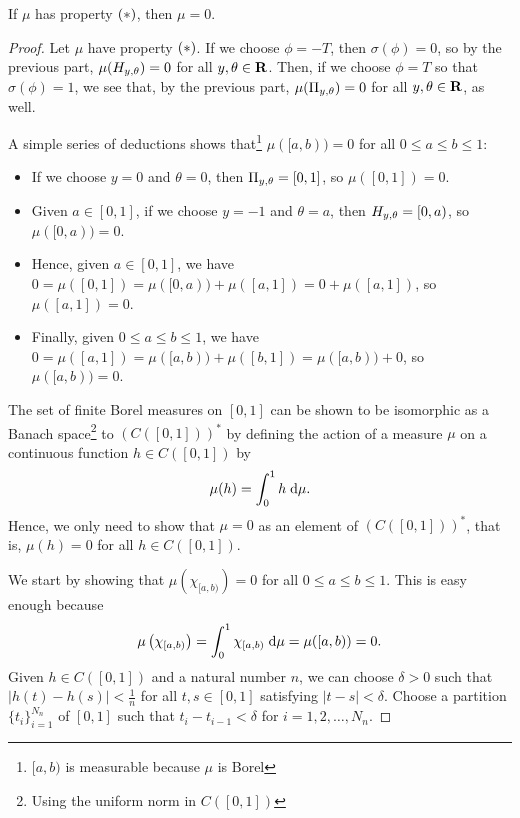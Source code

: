 \documentclass{homework}
\begin{document}
\begin{arabicparts}
		\questionpart
		If $\mu$ has property $(*)$, then $\mu = 0$.
		\begin{proof}
			Let $\mu$ have property $(*)$. If we choose $\phi = -T$, then $\sigma(\phi) = 0$, so by the previous part, $\mu({H_{y,\theta}}) = 0$ for all $y, \theta \in \textbf{R}$. Then, if we choose $\phi = T$ so that $\sigma(\phi) = 1$, we see that, by the previous part, $\mu({\Pi_{y,\theta}}) = 0$ for all $y, \theta\in \textbf{R}$, as well.
			
			A simple series of deductions shows that\footnote{$[a,b)$ is measurable because $\mu$ is Borel} $\mu([a,b)) =0$ for all $0 \le a \le b \le 1$:
			\begin{itemize}
				\item If we choose $y = 0$ and $\theta = 0$, then ${\Pi_{y,\theta}} = [0,1]$, so $\mu([0,1]) = 0$.
				\item Given $a \in [0,1]$, if we choose $y = -1$ and $\theta = a$, then ${H_{y,\theta}} = [0,a)$, so $\mu([0,a)) = 0$.
				\item Hence, given $a \in [0,1]$, we have $0 = \mu([0,1]) = \mu([0,a)) + \mu([a, 1]) = 0 + \mu([a,1])$, so $\mu([a,1]) = 0$.
				\item Finally, given $0 \le a \le b \le 1$, we have $0 = \mu([a,1]) = \mu([a,b)) + \mu([b,1]) = \mu([a,b)) + 0$, so $\mu([a,b)) = 0$.
			\end{itemize}
			
			The set of finite Borel measures on $[0,1]$ can be shown to be isomorphic as a Banach space\footnote{Using the uniform norm in $C([0,1])$} to $(C([0,1]))^*$ by defining the action of a measure $\mu$ on a continuous function $h \in C([0,1])$ by
			\begin{equation}
				\mu(h) = \int_0^1h\;\text{d}\mu.
			\end{equation}
			Hence, we only need to show that $\mu = 0$ as an element of $(C([0,1]))^*$, that is, $\mu(h) = 0$ for all $h \in C([0,1])$.
			
			We start by showing that $\mu\left(\chi_{[a,b)}\right) = 0$ for all $0 \le a \le b \le 1$. This is easy enough because
			\begin{equation}
				\mu\left(\chi_{[a,b)}\right) = \int_0^1 \chi_{[a,b)}\;\text{d}\mu = \mu([a,b)) = 0.
			\end{equation}
			Given $h \in C([0,1])$ and a natural number $n$, we can choose $\delta > 0$ such that $|h(t) - h(s)| < \frac{1}{n}$ for all $t,s \in [0,1]$ satisfying $|t-s| < \delta$. Choose a partition $\{t_i\}_{i=1}^{N_n}$ of $[0,1]$ such that $t_i - t_{i-1} < \delta$ for $i =1,2,\dots,N_n$.
			

\end{proof}
\end{arabicparts}
\end{document}
